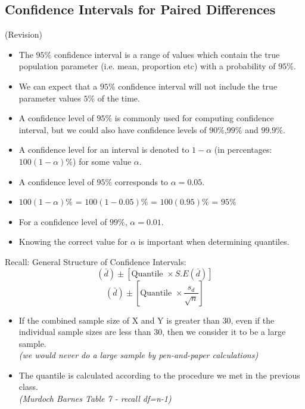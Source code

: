 \documentclass[a4paper,12pt]{article}
\begin{document}
\subsection*{Confidence Intervals for Paired Differences  }
(Revision)
\begin{itemize}
\item The $95\%$ confidence interval is a range of values which contain the true population parameter (i.e. mean, proportion etc) with a probability of $95\%$.
\item We can expect that a $95\%$ confidence interval will not include the true parameter values $5\%$ of the time.
\item A confidence level of $95\%$ is commonly used for computing confidence interval, but we could also have confidence levels of $90\%$,$99\%$ and $99.9\%$.

\item A confidence level for an interval is denoted to $1-\alpha$ (in percentages: $100(1-\alpha)\%$) for some value $\alpha$.
\item A confidence level of $95\%$ corresponds to $\alpha = 0.05$.
\item $100(1-\alpha)\%$ = $100(1-0.05)\%$  = $100(0.95)\%$ = $95\%$
\item For a confidence level of $99\%$, $\alpha = 0.01$.
\item Knowing the correct value for $\alpha$ is important when determining quantiles.
\end{itemize}
Recall: General Structure of Confidence Intervals:
\smallskip
\[ ( \bar{d} ) \pm \left[ \mbox{Quantile } \times S.E(\bar{d}) \right] \]
\[ ( \bar{d} ) \pm \left[ \mbox{Quantile } \times \frac{s_d}{\sqrt{n}} \right] \]
\begin{itemize}
\item If the combined sample size of X and Y is greater than 30, even if the individual sample sizes are less than 30, then we consider it to be a large sample.\\ \textit{(we would never do a large sample by pen-and-paper calculations)}
\item The quantile is calculated according to the procedure we met in the previous class.\\ \textit{(Murdoch Barnes Table 7 - recall \textit{df=n-1})}
\end{itemize}

\end{document}
